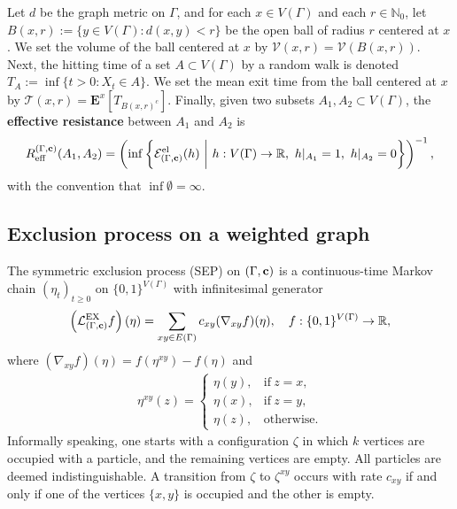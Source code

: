 \documentclass[11pt]{amsart}
\theoremstyle{plain}
\theoremstyle{definition}
\theoremstyle{remark}
\begin{document}
Let $d$ be the graph metric on $\Gamma$, and for each $x\in V(\Gamma)$ and each $r\in \mathbb{N}_0$, let $B(x,r) := \{y\in V(\Gamma): d(x,y) < r\}$ be the open ball of radius $r$ centered at $x$. We set the volume of the ball centered at $x$ by
$
\mathcal{V}(x, r) = \mathcal{V}(B(x,r))
$.
Next, the hitting time of a set $A\subset V(\Gamma)$ by a random walk is denoted $T_A :=\inf\{t>0: X_t \in  A\}$.  We set the mean exit time from the ball centered at $x$ by
$
\mathcal{T}(x,r) = \mathbf{E}^x\left[T_{B(x,r)^c}\right]
$.
Finally, given two subsets $A_1, A_2 \subset V(\Gamma)$, the \textbf{effective resistance} between $A_1$ and $A_2$ is
\begin{align}
\label{Reff}
R_{\rm eff}^{(\Gamma, {\bf c})}(A_1,A_2) = \left(\inf\left\{ \mathcal{E}^{\rm el}_{(\Gamma,{\bf c})}(h) ~\bigg|~ h:V(\Gamma)\to\mathbb{R},~ h|_{A_1}=1,~h|_{A_2}=0\right\}\right)^{-1},
\end{align}
with the convention that $\inf \emptyset = \infty$.

\subsection{Exclusion process on a weighted graph} \label{sec:exclusion}

The symmetric exclusion process (SEP) on $(\Gamma, {\bf c})$ is a continuous-time Markov chain $(\eta_t)_{t\geq 0}$ on $\{0,1\}^{V(\Gamma)}$ with infinitesimal generator
\begin{align}
\left(\mathcal{L}_{(\Gamma, {\bf c})}^{\rm EX} f\right)(\eta) = \sum_{xy\in E(\Gamma)} c_{xy} (\nabla_{xy} f)(\eta), \quad f: \{0,1\}^{V(\Gamma)} \to \mathbb{R},
\end{align}
where $(\nabla_{xy} f)(\eta) = f(\eta^{xy})-f(\eta)$
and
\begin{align}
\eta^{xy}(z) = \left\{\begin{array}{ll}\eta(y),& \text{if}~z=x, \\ \eta(x), & \text{if}~z=y, \\ \eta(z), & \text{otherwise}.\end{array} \right.
\end{align}
Informally speaking, one starts with a configuration $\zeta$ in which $k$ vertices are occupied with a particle, and the remaining vertices are empty. All particles are deemed indistinguishable. A transition from $\zeta$ to $\zeta^{xy}$ occurs with rate $c_{xy}$ if and only if one of the vertices $\{x,y\}$ is occupied and the other is empty.
\end{document}
